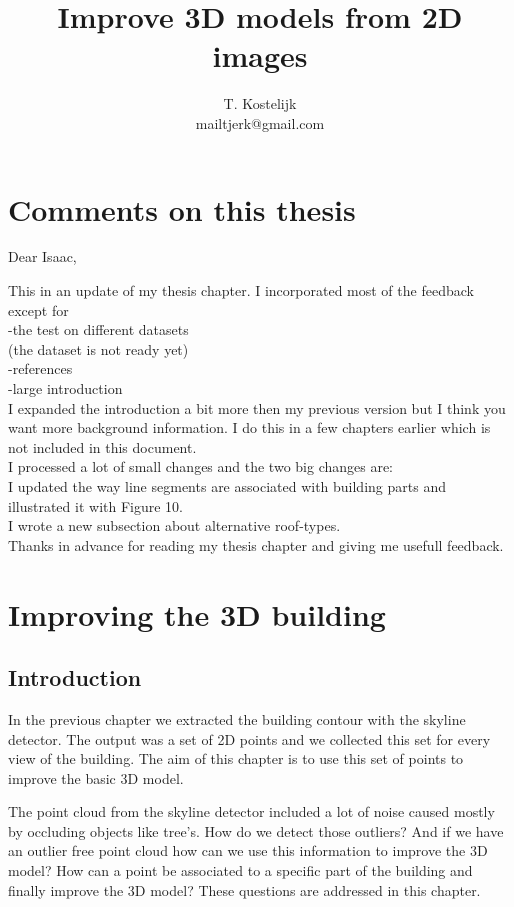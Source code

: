 \documentclass[10pt]{article}
\title{\sc Improve 3D models from 2D images}
\author{T. Kostelijk\\mailtjerk@gmail.com}
\begin{document}
\maketitle




\section{Comments on this thesis}
Dear Isaac,

This in an update of my thesis chapter. I incorporated most of the feedback except for\\
-the test on different datasets\\
(the dataset is not ready yet)\\
-references\\
-large introduction\\
I expanded the introduction a bit more then my previous version but I think you want more background
information. I do this in a few chapters earlier which is not included in this document.\\
I processed a lot of small changes and the two big changes are:\\
I updated the way line segments are associated with building parts and illustrated it with Figure 10.\\
I wrote a new subsection about alternative roof-types.\\
Thanks in advance for reading my thesis chapter and giving me usefull feedback.

 
\section{Improving the 3D building}
\subsection{Introduction}
In the previous chapter we extracted the building contour with the skyline
detector. The output was a set of 2D points and we collected this set for every
view of the building.  The aim of this chapter is to use this set of points to
improve the basic 3D model. 

The point cloud from the skyline detector included a lot of noise caused mostly
by occluding objects like tree's. How do we detect those outliers?
And if we have an outlier free point cloud how can we use this information to
improve the 3D model? How can a point be associated to a specific part of the
building and finally improve the 3D model? 
These questions are addressed in this chapter.
\end{document}
